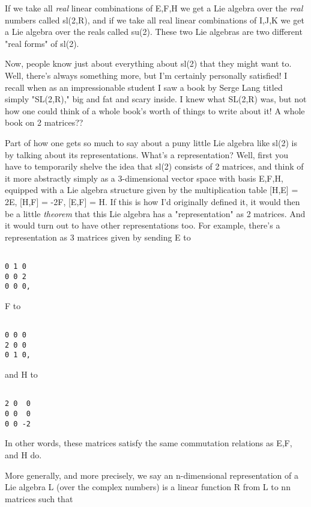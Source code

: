 If we take all \emph{real} linear combinations of E,F,H we get a Lie algebra
over the \emph{real} numbers called sl(2,R), and if we take all real linear
combinations of I,J,K we get a Lie algebra over the reals called
su(2).  These two Lie algebras are two different "real forms" of sl(2).  

Now, people know just about everything about sl(2) that they might want
to.  Well, there's always something more, but I'm certainly personally
satisfied!  I recall when as an impressionable student I saw a book by
Serge Lang titled simply "SL(2,R)," big and fat and scary inside.  I
knew what SL(2,R) was, but not how one could think of a whole book's
worth of things to write about it!  A whole book on 2 matrices??  

Part of how one gets so much to say about a puny little Lie algebra
like sl(2) is by talking about its representations.  What's a
representation?  Well, first you have to temporarily shelve the idea
that sl(2) consists of 2 matrices, and think of it more
abstractly simply as a 3-dimensional vector space with basis E,F,H,
equipped with a Lie algebra structure given by the multiplication
table [H,E] = 2E, [H,F] = -2F, [E,F] = H.  If this is how I'd
originally defined it, it would then be a little \emph{theorem} that
this Lie algebra has a "representation" as 2 matrices.  And it
would turn out to have other representations too.  For example,
there's a representation as 3 matrices given by sending E to


\begin{verbatim}

0 1 0
0 0 2
0 0 0, 
\end{verbatim}
    

F to 


\begin{verbatim}

0 0 0 
2 0 0 
0 1 0, 
\end{verbatim}
    

and H to 


\begin{verbatim}

2 0  0 
0 0  0 
0 0 -2
\end{verbatim}
    

In other words, these matrices satisfy the same commutation relations as
E,F, and H do.  

More generally, and more precisely, we say an n-dimensional
representation of a Lie algebra L (over the complex numbers) is a linear
function R from L to n\times n matrices such that



